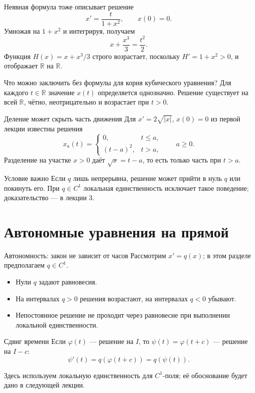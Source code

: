 \documentclass[aspectratio=169,11pt]{beamer}
\newcommand{\R}{\mathbb R}
\begin{document}
\begin{frame}{Неявная формула тоже описывает решение}
\[
x'=\frac{t}{1+x^2},\qquad x(0)=0.
\]
Умножая на $1+x^2$ и интегрируя, получаем
\[
\boxed{x+\frac{x^3}{3}=\frac{t^2}{2}}.
\]
Функция $H(x)=x+x^3/3$ строго возрастает, поскольку $H'=1+x^2>0$,
и отображает $\R$ на $\R$.
\begin{block}{Что можно заключить без формулы для корня кубического уравнения?}
Для каждого $t\in\R$ значение $x(t)$ определяется однозначно.
Решение существует на всей $\R$, чётно, неотрицательно
и возрастает при $t>0$.
\end{block}
\end{frame}

\begin{frame}{Деление может скрыть часть движения}
Для $x'=2\sqrt{|x|}$, $x(0)=0$ из первой лекции известны решения
\[
x_a(t)=
\begin{cases}
0,&t\le a,\\
(t-a)^2,&t>a,
\end{cases}
\qquad a\ge0.
\]
Разделение на участке $x>0$ даёт $\sqrt{x}=t-a$,
то есть только часть при $t>a$.
\begin{alertblock}{Условие важно}
Если $q$ лишь непрерывна, решение может прийти в нуль $q$
или покинуть его. При $q\in C^1$ локальная единственность
исключает такое поведение; доказательство --- в лекции 3.
\end{alertblock}
\end{frame}

\section{Автономные уравнения на прямой}
\begin{frame}{Автономность: закон не зависит от часов}
Рассмотрим $x'=q(x)$; в этом разделе предполагаем $q\in C^1$.
\begin{itemize}
\item Нули $q$ задают равновесия.
\item На интервалах $q>0$ решения возрастают, на интервалах $q<0$ убывают.
\item Непостоянное решение не проходит через равновесие
при выполнении локальной единственности.
\end{itemize}
\begin{block}{Сдвиг времени}
Если $\varphi(t)$ --- решение на $I$, то $\psi(t)=\varphi(t+c)$
--- решение на $I-c$:
\[
\psi'(t)=q(\varphi(t+c))=q(\psi(t)).
\]
\end{block}
Здесь используем локальную единственность для $C^1$-поля;
её обоснование будет дано в следующей лекции.
\end{frame}
\end{document}
